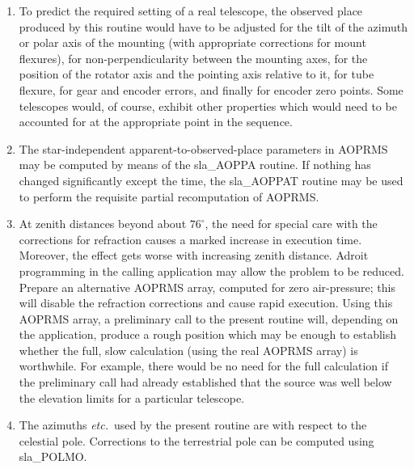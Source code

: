 \documentclass[11pt,twoside,nolof]{starlink}
\begin{document}
{\begin{enumerate}
        motion, and is the position that would be seen by a perfect
        equatorial located at the observer and with its polar axis
        aligned to the Earth's axis of rotation (\textit{n.b.}\ not to the
        refracted pole).  Finally, the $\alpha$ is obtained by subtracting
        the \textit{h}\/ from the local apparent ST.
  \item To predict the required setting of a real telescope, the
        observed place produced by this routine would have to be
        adjusted for the tilt of the azimuth or polar axis of the
        mounting (with appropriate corrections for mount flexures),
        for non-perpendicularity between the mounting axes, for the
        position of the rotator axis and the pointing axis relative
        to it, for tube flexure, for gear and encoder errors, and
        finally for encoder zero points.  Some telescopes would, of
        course, exhibit other properties which would need to be
        accounted for at the appropriate point in the sequence.
  \item The star-independent apparent-to-observed-place parameters
        in AOPRMS may be computed by means of the sla\_AOPPA routine.
        If nothing has changed significantly except the time, the
        sla\_AOPPAT routine may be used to perform the requisite
        partial recomputation of AOPRMS.
  \item At zenith distances beyond about $76^\circ$, the need for
        special care with the corrections for refraction causes a
        marked increase in execution time.  Moreover, the effect
        gets worse with increasing zenith distance.  Adroit
        programming in the calling application may allow the
        problem to be reduced.  Prepare an alternative AOPRMS array,
        computed for zero air-pressure;  this will disable the
        refraction corrections and cause rapid execution.  Using
        this AOPRMS array, a preliminary call to the present routine
        will, depending on the application, produce a rough position
        which may be enough to establish whether the full, slow
        calculation (using the real AOPRMS array) is worthwhile.
        For example, there would be no need for the full calculation
        if the preliminary call had already established that the
        source was well below the elevation limits for a particular
        telescope.
  \item The azimuths \textit{etc.}\ used by the present routine are with
        respect to the celestial pole.  Corrections to the terrestrial pole
        can be computed using sla\_POLMO.
 \end{enumerate}
}
\end{document}
